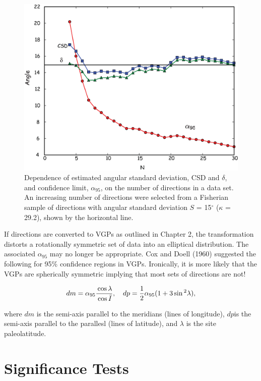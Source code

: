 \begin{figure}[htb]
\centering  \includegraphics[width= 10 cm]{EPSfiles/a95-csd.eps}
\caption { Dependence of estimated angular
standard deviation, CSD and $\delta$, and confidence
limit, $\alpha_{95}$, on the number of directions
in a data set. An increasing number
of directions were selected from a
Fisherian sample of directions with
angular standard deviation $S$ = 15$^{\circ}$
($\kappa$ = 29.2),  shown by the horizontal line.
}
\label{fig:a95-csd}
\end{figure}




If directions are converted to VGPs as outlined in Chapter 2,  the
transformation distorts a rotationally symmetric set of data
into an elliptical distribution.  The associated $\alpha_{95}$  may  no
longer be appropriate.  
Cox and Doell (1960) \nocite{cox60}  suggested the following for 95\% confidence regions in 
VGPs.  Ironically, it is more likely that the VGPs are spherically symmetric implying that most sets of directions are not!

\begin{equation}
dm = {\alpha_{95}}{\cos \lambda \over {\cos \bar I}}, \hskip 1em dp = {1\over 2}{\alpha_{95}}{(1 + 3 \sin^2 \lambda)},
\label{eq:dpdm}
\end{equation}

\noindent where $dm$ is the semi-axis parallel to  the meridians 
(lines of longitude), $dp$is the semi-axis parallel to the parallesl
(lines of latitude), and $\lambda$ is the site paleolatitude.


\section{Significance Tests}

